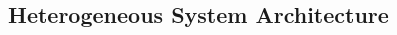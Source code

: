 \documentclass[handout]{beamer}
\begin{document}
\begin{CJK}{UTF8}{bkai}
            \subsection{Heterogeneous System Architecture}


\end{CJK}
\end{document}
